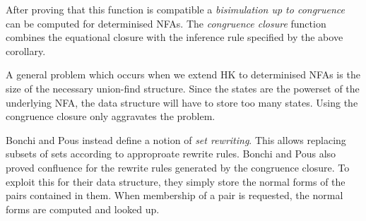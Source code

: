After proving that this function is compatible a
  \emph{bisimulation up to congruence} can be computed for determinised NFAs.
The \emph{congruence closure} function combines the equational closure with
  the inference rule specified by the above corollary.

A general problem which occurs when we extend HK to determinised NFAs is the
size of the necessary union-find structure.
Since the states are the powerset of the underlying NFA, the data structure
will have to store too many states.
Using the congruence closure only aggravates the problem.

Bonchi and Pous instead define a notion of \emph{set rewriting}.
This allows replacing subsets of sets according to approproate rewrite rules.
Bonchi and Pous also proved confluence for the rewrite rules generated by
the congruence closure.
To exploit this for their data structure, they simply store the normal forms of
the pairs contained in them.
When membership of a pair is requested, the normal forms are computed and
looked up.
